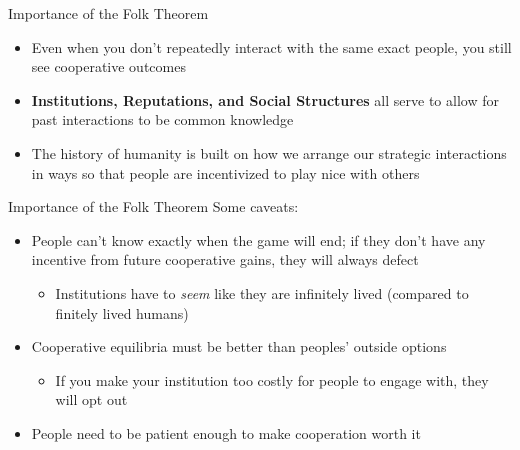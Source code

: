 \begin{frame}{Importance of the Folk Theorem}
  \begin{itemize}
    \item Even when you don't repeatedly interact with the same exact people, you still see cooperative outcomes 
    \item \textbf{Institutions, Reputations, and Social Structures} all serve to allow for past interactions to be common knowledge
    \item The history of humanity is built on how we arrange our strategic interactions in ways so that people are incentivized to play nice with others
  \end{itemize}
\end{frame}

\begin{frame}{Importance of the Folk Theorem}
  Some caveats:
  \begin{itemize}
    \item People can't know exactly when the game will end; if they don't have any incentive from future cooperative gains, they will always defect
    \begin{itemize}
      \item Institutions have to \textit{seem} like they are infinitely lived (compared to finitely lived humans)
    \end{itemize}
    \item Cooperative equilibria must be better than peoples' outside options 
    \begin{itemize}
      \item If you make your institution too costly for people to engage with, they will opt out 
    \end{itemize}
    \item People need to be patient enough to make cooperation worth it
  \end{itemize}
\end{frame}
